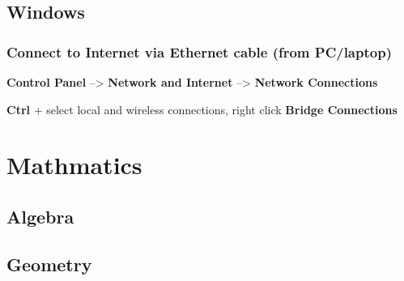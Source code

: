 \documentclass[letterpaper,10pt,english]{sphinxmanual}
\begin{document}
\section{Windows}
\label{system/windows:windows}\label{system/windows::doc}

\subsection{Connect to Internet via Ethernet cable (from PC/laptop)}
\label{system/windows:connect-to-internet-via-ethernet-cable-from-pc-laptop}
\textbf{Control Panel} --\textgreater{} \textbf{Network and Internet} --\textgreater{} \textbf{Network Connections}

\textbf{Ctrl} + select local and wireless connections, right click \textbf{Bridge Connections}


\chapter{Mathmatics}
\label{index:mathmatics}

\section{Algebra}
\label{math/algebra::doc}\label{math/algebra:algebra}

\section{Geometry}
\label{math/geometry:geometry}\label{math/geometry::doc}


\renewcommand{\indexname}{Index}
\printindex
\end{document}
